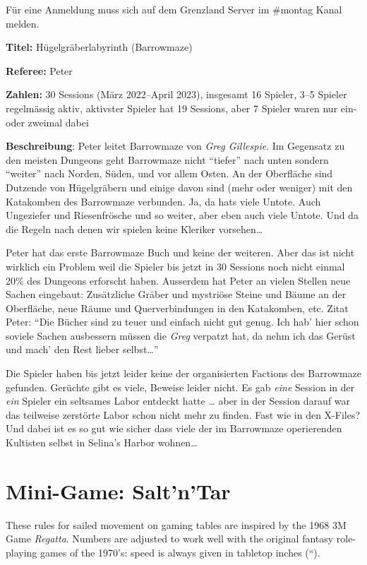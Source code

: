 \documentclass[11pt]{wbzine}
\begin{document}
\begin{multicols}{2}
Für eine Anmeldung muss sich auf dem Grenzland Server im \#montag
Kanal melden. 

\textbf{Titel:} Hügelgräberlabyrinth (Barrowmaze)

\textbf{Referee:} Peter

\textbf{Zahlen:} 30 Sessions (März 2022--April 2023),
insgesamt 16 Spieler,
3--5 Spieler regelmässig aktiv,
aktivster Spieler hat 19 Sessions,
aber 7 Spieler waren nur ein- oder zweimal dabei

\textbf{Beschreibung}: Peter leitet Barrowmaze von \textit{Greg Gillespie}.
Im Gegensatz zu den meisten Dungeons geht Barrowmaze nicht ``tiefer'' nach
unten sondern ``weiter'' nach Norden, Süden, und vor allem Osten. An der
Oberfläche sind Dutzende von Hügelgräbern und einige davon sind (mehr oder
weniger) mit den Katakomben des Barrowmaze verbunden. Ja, da hats viele
Untote. Auch Ungeziefer und Riesenfrösche und so weiter, aber eben auch
viele Untote. Und da die Regeln nach denen wir spielen keine Kleriker
vorsehen\dots{}

Peter hat das erste Barrowmaze Buch und keine der weiteren. Aber das ist
nicht wirklich ein Problem weil die Spieler bis jetzt in 30 Sessions noch
nicht einmal 20\% des Dungeons erforscht haben. Ausserdem hat Peter an
vielen Stellen neue Sachen eingebaut: Zusätzliche Gräber und mystriöse
Steine und Bäume an der Oberfläche, neue Räume und Querverbindungen in
den Katakomben, etc. Zitat Peter: ``Die Bücher sind zu teuer und einfach
nicht gut genug. Ich hab' hier schon soviele Sachen ausbessern müssen die
\textit{Greg} verpatzt hat, da nehm ich das Gerüst und mach' den Rest
lieber selbst\dots{}''

Die Spieler haben bis jetzt leider keine der organisierten Factions des
Barrowmaze gefunden. Gerüchte gibt es viele, Beweise leider nicht. Es gab
\emph{eine} Session in der \emph{ein} Spieler ein seltsames Labor entdeckt
hatte \dots{} aber in der Session darauf war das teilweise zerstörte Labor
schon nicht mehr zu finden. Fast wie in den X-Files? Und dabei ist es so
gut wie sicher dass viele der im Barrowmaze operierenden Kultisten selbst
in Selina's Harbor wohnen\dots{}

\section{Mini-Game: Salt'n'Tar}

These rules for sailed movement on gaming tables are inspired by the
1968 3M Game \emph{Regatta}. Numbers are adjusted to work well with the
original fantasy role-playing games of the 1970's: speed is always given
in tabletop inches (``).


\end{multicols}
\end{document}
